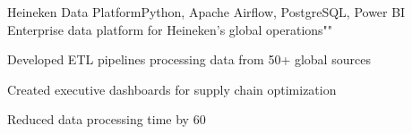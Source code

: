 \resumeSubheading
  {Heineken Data Platform}{Python, Apache Airflow, PostgreSQL, Power BI}
  {Enterprise data platform for Heineken's global operations}{""}
  \vspace{\experienceItemSpacing}
  \resumeItemListStart
\item Developed ETL pipelines processing data from 50+ global sources
\item Created executive dashboards for supply chain optimization
\item Reduced data processing time by 60%
  \resumeItemListEnd